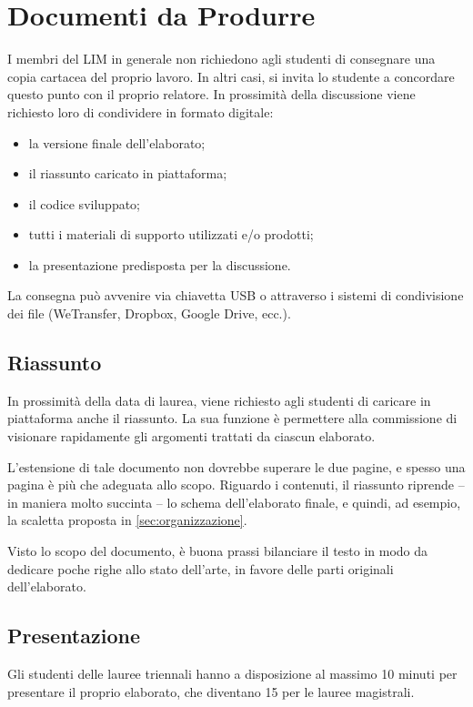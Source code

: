 \documentclass[12pt]{report}
\begin{document}
    \chapter{Documenti da Produrre}
    I membri del LIM in generale non richiedono agli studenti di consegnare una copia cartacea del proprio lavoro. In altri casi, si invita lo studente a concordare questo punto con il proprio relatore.
    In prossimità della discussione viene richiesto loro di condividere in formato digitale:
    \begin{itemize}
        \item la versione finale dell'elaborato;
        \item il riassunto caricato in piattaforma;
        \item il codice sviluppato;
        \item tutti i materiali di supporto utilizzati e/o prodotti;
        \item la presentazione predisposta per la discussione.
    \end{itemize}

    La consegna può avvenire via chiavetta USB o attraverso i sistemi di condivisione dei file (WeTransfer, Dropbox, Google Drive, ecc.).

    \section{Riassunto}
    In prossimità della data di laurea, viene richiesto agli studenti di caricare in piattaforma anche il riassunto. La sua funzione è permettere alla commissione di visionare rapidamente gli argomenti trattati da ciascun elaborato.

    L'estensione di tale documento non dovrebbe superare le due pagine, e spesso una pagina è più che adeguata allo scopo. Riguardo i contenuti, il riassunto riprende -- in maniera molto succinta -- lo schema dell'elaborato finale, e quindi, ad esempio, la scaletta proposta in \ref{sec:organizzazione}.

    Visto lo scopo del documento, è buona prassi bilanciare il testo in modo da dedicare poche righe allo stato dell'arte, in favore delle parti originali dell'elaborato.

    \section{Presentazione}
    Gli studenti delle lauree triennali hanno a disposizione al massimo 10 minuti per presentare il proprio elaborato, che diventano 15 per le lauree magistrali.
\end{document}
